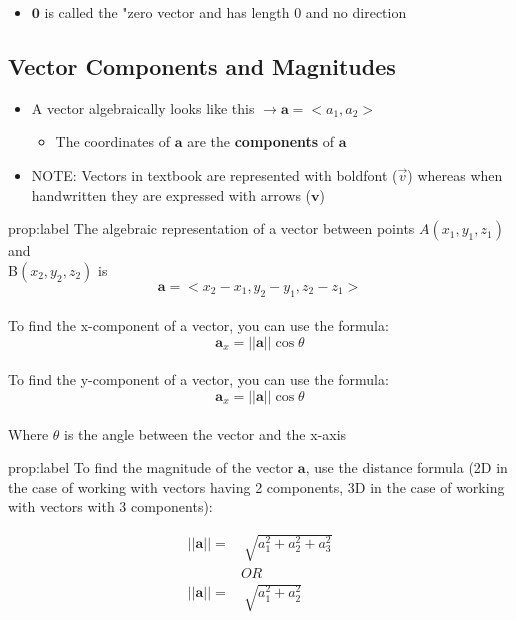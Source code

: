 \documentclass{package/notes}
\begin{document}
\begin{itemize}
	\item $\mathbf{0}$ is called the "zero vector and has length $0$ and no direction
\end{itemize}

\subsection{Vector Components and Magnitudes}

\begin{itemize}
	\item A vector algebraically looks like this $\to \mathbf{a} = <a_1, a_2>$ 
	\begin{itemize}
		\item The coordinates of $\mathbf a$ are the \textbf{components} of
		$\mathbf a$ 
	\end{itemize}
	\item NOTE: Vectors in textbook are represented with boldfont ($\vec{v}$) whereas when handwritten they are expressed with arrows ($\mathbf{v}$) %
\end{itemize}

\newpage
\begin{proposition}{prop:label}
	The algebraic representation of a vector between points $A(x_1, y_1, z_1)$ and\\ B$(x_2, y_2,z_2)$ is
	$$\mathbf a = <x_2-x_1,y_2-y_1,z_2-z_1>$$\\

	To find the x-component of a vector, you can use the formula:
	$$\mathbf a_x = ||\mathbf a||\cos\theta$$\\

	To find the y-component of a vector, you can use the formula:
	$$\mathbf a_x = ||\mathbf a||\cos\theta$$\\

	Where $\theta$ is the angle between the vector and the x-axis
\end{proposition}

\begin{proposition}{prop:label}
	To find the magnitude of the vector $\mathbf a$, use the distance formula (2D in the case of working with vectors having 2 components, 3D in the case of working with vectors with 3 components):

	\begin{equation*}
		\begin{aligned}
			||\mathbf a|| =&\: \sqrt {a_1^2 + a_2^2 + a_3^2}\\
			&OR\\
			||\mathbf a|| =&\: \sqrt {a_1^2 + a_2^2}\\
		\end{aligned}
	\end{equation*}
\end{proposition}
\end{document}

